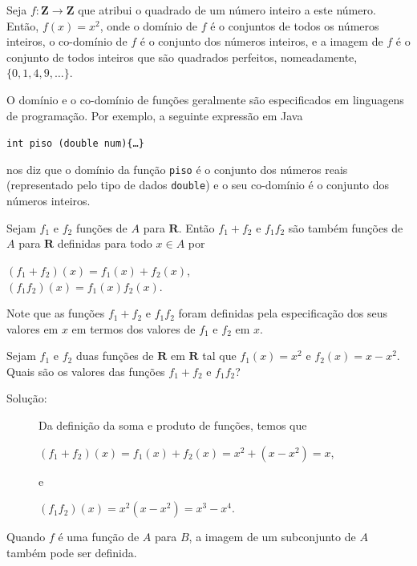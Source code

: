 \begin{exmp}

Seja $f: \mathbf{Z} \to \mathbf{Z}$ que atribui o quadrado de um número inteiro
a este número. Então, $f(x) = x^2$, onde o domínio de $f$ é o conjuntos de
todos os números inteiros, o co-domínio de $f$ é o conjunto dos números
inteiros, e a imagem de $f$ é o conjunto de todos inteiros que são quadrados
perfeitos, nomeadamente, $\{0,1,4,9,\ldots\}$.
\end{exmp}

\begin{exmp}

O domínio e o co-domínio de funções geralmente são especificados em linguagens
de programação. Por exemplo, a seguinte expressão em Java
\begin{center}
\texttt{int piso (double num)\{\ldots\}}
\end{center}
nos diz que o domínio da função \texttt{piso} é o conjunto dos números
reais (representado pelo tipo de dados \texttt{double}) e o seu co-domínio é o
conjunto dos números inteiros.
\end{exmp}


\begin{defn}
\label{def317}
Sejam $f_1$ e $f_2$ funções de $A$ para $\mathbf{R}$. Então $f_1 + f_2$ e
$f_1f_2$ são também funções de $A$ para $\mathbf{R}$ definidas para todo $x \in
A$ por

\begin{center}
$(f_1+f_2)(x) = f_1(x) + f_2(x)$,\\
$(f_1f_2)(x) = f_1(x)f_2(x)$.
\end{center}

Note que as funções $f_1+f_2$ e $f_1f_2$ foram definidas pela especificação dos
seus valores em $x$ em termos dos valores de $f_1$ e $f_2$ em $x$.
\end{defn}

\begin{exemp}

Sejam $f_1$ e $f_2$ duas funções de $\mathbf{R}$ em $\mathbf{R}$ tal que
$f_1(x) = x^2$ e $f_2(x) = x - x^2$. Quais são os valores das funções $f_1 +
f_2$ e $f_1f_2$?
\begin{description}
\item[Solução:] Da definição da soma e produto de funções, temos que
\begin{center}
$(f_1 + f_2)(x) = f_1(x) + f_2(x) = x^2 + (x - x^2) = x$,
\end{center}
e
\begin{center}
$(f_1f_2)(x)=x^2(x-x^2) = x^3-x^4$.
\end{center}
\end{description}
\end{exemp}
Quando $f$ é uma função de $A$ para $B$, a imagem de um subconjunto de $A$
também pode ser definida.


